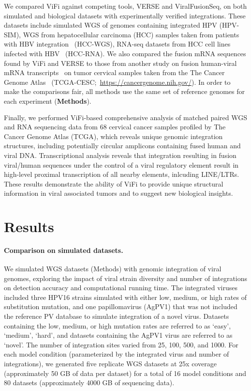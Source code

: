 \documentclass{bmcart}
\begin{document}
We compared ViFi against competing tools, VERSE and ViralFusionSeq, on
both simulated and biological datasets with experimentally verified
integrations.  These 
datasets include simulated WGS of genomes
containing integrated HPV (HPV-SIM), WGS from hepatocellular carcinoma (HCC) samples taken from
patients with HBV integration~\cite{Sung2012} (HCC-WGS), RNA-seq
datasets from HCC cell lines infected with HBV~\cite{Lau2014}
(HCC-RNA).  We also compared the fusion mRNA sequences found by ViFi
and VERSE to those from another study on fusion human-viral mRNA
transcripts~\cite{Tang2013} on tumor cervical samples taken from the
The Cancer Genome Atlas~\cite{TCGA} (TCGA-CESC;~\url{https://cancergenome.nih.gov/}).  In order to make the comparisons fair, all methods use the same set of reference genomes for each experiment (\textbf{Methods}). 

Finally, we performed ViFi-based comprehensive analysis of matched paired WGS and RNA sequencing data from 68 cervical cancer samples profiled by The Cancer Genome Atlas (TCGA), which reveals unique genomic integration structures, including potentially circular amplicons containing fused human and viral DNA.  Transcriptional analysis reveals that integration resulting in fusion viral/human sequences under the control of a viral regulatory element result in high-level proximal transcription of all nearby elements, inlcuding LINE/LTRs. These results demonstrate the ability of ViFi to provide unique structural information in viral associated tumors and to suggest new biological insights.

\section*{Results}
\paragraph{\textbf{Comparison on simulated datasets.}}  We simulated
WGS datasets (Methods) with genomic integration of viral genomes,
exploring the impact of viral strain diversity and number of
integrations on detection accuracy and computational running time.
The integrated viruses included three HPV16 strains simulated with
either low, medium, or high rates of substitution mutation, and one
papillomavirus (AgPV1) that was not included the reference PV database
to simulate integration of a novel virus.  Datasets containing the low,
medium, or high mutation rates are referred to as `easy', `medium',
`hard', and datasets containing the AgPV1 virus are referred to as
`novel'.  The number of integration sites varied from 25, 100, 500,
and 1000.  For each model condition (parameterized by the integrated
virus and number of integrations), we generated five replicate WGS
datasets at 25x coverage (approximately 50 GB of data per dataset) for
a total of 16 model conditions and 80 datasets (approximately 4000 GB of sequencing data).
\end{document}
